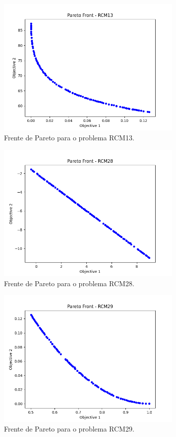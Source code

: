 \documentclass[12pt,openright,oneside,a4paper,english,brazil]{abntex2}
\begin{document}
\begin{figure}[h!]
    \centering
    \includegraphics[width=0.8\textwidth]{results/RCM13.png}
    \caption{Frente de Pareto para o problema RCM13.}
    \label{fig:rcm13_pareto}
\end{figure}

\begin{figure}[h!]
    \centering
    \includegraphics[width=0.8\textwidth]{results/RCM28.png}
    \caption{Frente de Pareto para o problema RCM28.}
    \label{fig:rcm28_pareto}
\end{figure}

\begin{figure}[h!]
    \centering
    \includegraphics[width=0.8\textwidth]{results/RCM29.png}
    \caption{Frente de Pareto para o problema RCM29.}
    \label{fig:rcm29_pareto}
\end{figure}
\end{document}
